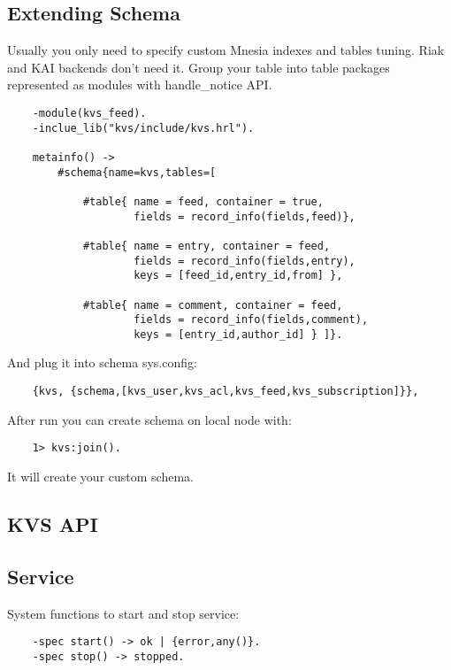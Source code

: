 \subsection{Extending Schema}

Usually you only need to specify custom Mnesia indexes and tables tuning.
Riak and KAI backends don't need it. Group your table into table packages
represented as modules with handle\_notice API.

\begin{lstlisting}
    -module(kvs_feed).
    -inclue_lib("kvs/include/kvs.hrl").

    metainfo() ->
        #schema{name=kvs,tables=[

            #table{ name = feed, container = true,
                    fields = record_info(fields,feed)},

            #table{ name = entry, container = feed,
                    fields = record_info(fields,entry),
                    keys = [feed_id,entry_id,from] },

            #table{ name = comment, container = feed,
                    fields = record_info(fields,comment),
                    keys = [entry_id,author_id] } ]}.
\end{lstlisting}

And plug it into schema sys.config:

\begin{lstlisting}
    {kvs, {schema,[kvs_user,kvs_acl,kvs_feed,kvs_subscription]}},
\end{lstlisting}

After run you can create schema on local node with:

\begin{lstlisting}
    1> kvs:join().
\end{lstlisting}

It will create your custom schema.

\subsection{KVS API}

\subsection{Service}
System functions to start and stop service:

\vspace{1\baselineskip}
\begin{lstlisting}
    -spec start() -> ok | {error,any()}.
    -spec stop() -> stopped.
\end{lstlisting}
\vspace{1\baselineskip}

